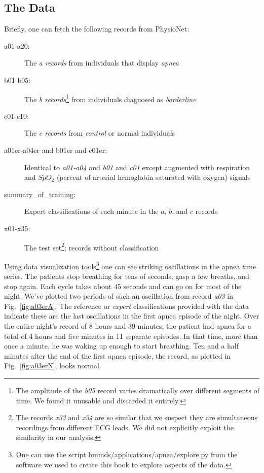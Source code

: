 \subsection{The Data}
\label{sec:data}

Briefly, one can fetch the following records from PhysioNet:
\begin{description}
\item[a01-a20:] The \emph{a records} from individuals that display
  \emph{apnea}
\item[b01-b05:] The \emph{b records}\footnote{The amplitude of the
    \emph{b05} record varies dramatically over different segments of
    time.  We found it unusable and discarded it entirely.} from
  individuals diagnosed as \emph{borderline}
\item[c01-c10:] The \emph{c records} from \emph{control} or normal
  individuals
\item[a01er-a04er and b01er and c01er:] Identical to \emph{a01-a04}
  and \emph{b01} and \emph{c01} except augmented with respiration and
  $SpO_2$ (percent of arterial hemoglobin saturated with oxygen)
   signals
\item[summary\_of\_training:] Expert classifications of each minute in
  the $a$, $b$, and $c$ records
\item[x01-x35:] The test set\footnote{The records \emph{x33} and
    \emph{x34} are so similar that we suspect they are simultaneous
    recordings from different ECG leads.  We did not explicitly exploit
  the similarity in our analysis.}; records without classification
\end{description}

Using data visualization tools\footnote{One can use the script
  hmmds/applications/apnea/explore.py from the software we used to
  create this book to explore aspects of the data.} one can see
striking oscillations in the apnea time series.  The patients stop
breathing for tens of seconds, gasp a few breaths, and stop again.
Each cycle takes about 45 seconds and can go on for most of the night.
We've plotted two periods of such an oscillation from record \emph{a03}
in Fig.~\ref{fig:a03erA}.  The reference or \emph{expert}
classifications provided with the data indicate these are the last
oscillations in the first apnea episode of the night.  Over the entire
night's record of 8 hours and 39 minutes, the patient had apnea for a
total of 4 hours and five minutes in 11 separate episodes.  In that
time, more than once a minute, he was waking up enough to start
breathing.  Ten and a half minutes after the end of the first apnea
episode, the record, as plotted in Fig.~\ref{fig:a03erN}, looks
normal.

